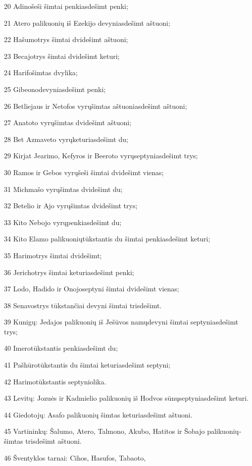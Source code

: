 \par 20 Adino­šeši šimtai penkiasdešimt penki; 
\par 21 Atero palikuonių iš Ezekijo­ devyniasdešimt aštuoni; 
\par 22 Hašumo­trys šimtai dvidešimt aštuoni; 
\par 23 Becajo­trys šimtai dvidešimt keturi; 
\par 24 Harifo­šimtas dvylika; 
\par 25 Gibeono­devyniasdešimt penki; 
\par 26 Betliejaus ir Netofos vyrų­šimtas aštuoniasdešimt aštuoni; 
\par 27 Anatoto vyrų­šimtas dvidešimt aštuoni; 
\par 28 Bet Azmaveto vyrų­keturiasdešimt du; 
\par 29 Kirjat Jearimo, Kefyros ir Beeroto vyrų­septyniasdešimt trys; 
\par 30 Ramos ir Gebos vyrų­šeši šimtai dvidešimt vienas; 
\par 31 Michmašo vyrų­šimtas dvidešimt du; 
\par 32 Betelio ir Ajo vyrų­šimtas dvidešimt trys; 
\par 33 Kito Nebojo vyrų­penkiasdešimt du; 
\par 34 Kito Elamo palikuonių­tūkstantis du šimtai penkiasdešimt keturi; 
\par 35 Harimo­trys šimtai dvidešimt; 
\par 36 Jericho­trys šimtai keturiasdešimt penki; 
\par 37 Lodo, Hadido ir Onojo­septyni šimtai dvidešimt vienas; 
\par 38 Senavos­trys tūkstančiai devyni šimtai trisdešimt. 
\par 39 Kunigų: Jedajos palikuonių iš Ješūvos namų­devyni šimtai septyniasdešimt trys; 
\par 40 Imero­tūkstantis penkiasdešimt du; 
\par 41 Pašhūro­tūkstantis du šimtai keturiasdešimt septyni; 
\par 42 Harimo­tūkstantis septyniolika. 
\par 43 Levitų: Jozuės ir Kadmielio palikuonių iš Hodvos sūnų­septyniasdešimt keturi. 
\par 44 Giedotojų: Asafo palikuonių­ šimtas keturiasdešimt aštuoni. 
\par 45 Vartininkų: Šalumo, Atero, Talmono, Akubo, Hatitos ir Šobajo palikuonių­šimtas trisdešimt aštuoni. 
\par 46 Šventyklos tarnai: Cihos, Hasufos, Tabaoto, 
